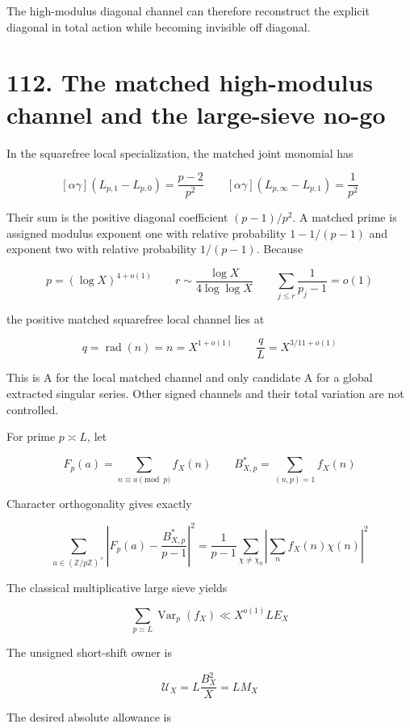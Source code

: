 \documentclass[
  11pt,
]{book}
\begin{document}
The high-modulus diagonal channel can therefore reconstruct the explicit
diagonal in total action while becoming invisible off diagonal.

\section{112. The matched high-modulus channel and the large-sieve
no-go}\label{the-matched-high-modulus-channel-and-the-large-sieve-no-go}

In the squarefree local specialization, the matched joint monomial has

\[
[\alpha\gamma](L_{p,1}-L_{p,0})
=\frac{p-2}{p^2}
\qquad
[\alpha\gamma](L_{p,\infty}-L_{p,1})
=\frac1{p^2}
\tag{112.1}
\]

Their sum is the positive diagonal coefficient \((p-1)/p^2\). A matched
prime is assigned modulus exponent one with relative probability
\(1-1/(p-1)\) and exponent two with relative probability \(1/(p-1)\).
Because

\[
p=(\log X)^{4+o(1)}
\qquad
r\sim\frac{\log X}{4\log\log X}
\qquad
\sum_{j\le r}\frac1{p_j-1}=o(1)
\tag{112.2}
\]

the positive matched squarefree local channel lies at

\[
\boxed{
q=\operatorname{rad}(n)=n=X^{1+o(1)}
\qquad
\frac qL=X^{3/11+o(1)}
}
\tag{112.3}
\]

This is A for the local matched channel and only candidate A for a
global extracted singular series. Other signed channels and their total
variation are not controlled.

For prime \(p\asymp L\), let

\[
F_p(a)=\sum_{n\equiv a\pmod p}f_X(n)
\qquad
B_{X,p}^*=\sum_{(n,p)=1}f_X(n)
\tag{112.4}
\]

Character orthogonality gives exactly

\[
\boxed{
\sum_{a\in(\mathbb Z/p\mathbb Z)^\times}
\left|
F_p(a)-\frac{B_{X,p}^*}{p-1}
\right|^2
=\frac1{p-1}
\sum_{\chi\ne\chi_0}
\left|\sum_nf_X(n)\chi(n)\right|^2
}
\tag{112.5}
\]

The classical multiplicative large sieve yields

\[
\sum_{p\asymp L}\operatorname{Var}_p(f_X)
\ll X^{o(1)}LE_X
\tag{112.6}
\]

The unsigned short-shift owner is

\[
\mathcal U_X=L\frac{B_X^2}{X}=LM_X
\tag{112.7}
\]

The desired absolute allowance is
\end{document}
